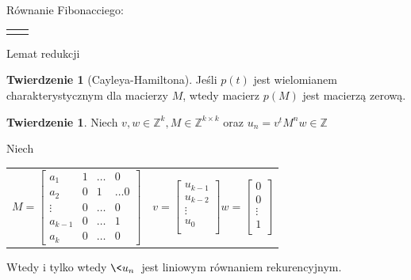 \documentclass[handout]{beamer}
\def\Z{\mathbb Z}
\theoremstyle{definition}
\newtheorem*{twierdzenie}{Twierdzenie}
\theoremstyle{named}
\newtheorem*{namedtheorem}{Twierdzenie}
\begin{document}
\begin{frame}{Równanie Fibonacciego:}
\begin{table}[]
\begin{tabular}{c|c}
\begin{equation*}
    \end{equation*}

    \end{tabular}
\end{table}


\end{frame}

\begin{frame}{Lemat redukcji}

\begin{namedtheorem}[Cayleya-Hamiltona]
    Jeśli $p(t)$ jest wielomianem charakterystycznym dla macierzy $M$, wtedy macierz $p(M)$ jest macierzą zerową. 
\end{namedtheorem}

\begin{twierdzenie}

    Niech $v, w \in \Z^{k}, M \in \Z^{k\times k}$ oraz $u_n = v^{t}M^{n}w \in \Z$
    
    Niech
    \begin{table}[]
        \centering
        \begin{tabular}{c|c}
    $
    M = \begin{bmatrix}
    a_{1} & 1 &  \ldots & 0 \\
    a_{2} & 0 & 1 & \ldots 0  \\
    \vdots & 0 & \ldots & 0 \\ 
    a_{k-1} & 0 & \ldots & 1 \\
    a_{k} & 0 & \ldots & 0
    \end{bmatrix}
    $
             &  
    $v= \begin{bmatrix}
    u_{k-1} \\ u_{k-2} \\ \vdots \\ u_{0} \\
    \end{bmatrix}
    w =  \begin{bmatrix}
    0 \\ 0 \\ \vdots \\ 1 \\
    \end{bmatrix}
    $
             & 
        \end{tabular}

    \end{table}
    
    Wtedy i tylko wtedy $\<u_n\>$ jest liniowym równaniem rekurencyjnym. 

\end{twierdzenie}

\end{frame}
\end{document}
